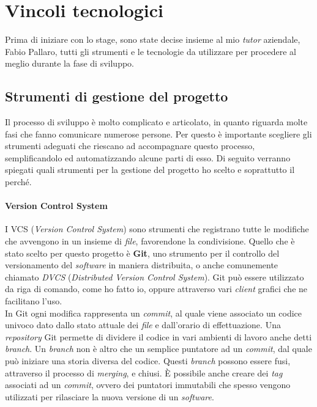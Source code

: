 
\section{Vincoli tecnologici}
Prima di iniziare con lo stage, sono state decise insieme al mio \textit{tutor} aziendale, Fabio Pallaro, tutti gli strumenti e le tecnologie da utilizzare per procedere al meglio durante la fase di sviluppo.

\subsection{Strumenti di gestione del progetto}
Il processo di sviluppo è molto complicato e articolato, in quanto riguarda molte fasi che fanno comunicare numerose persone. Per questo è importante scegliere gli strumenti adeguati che riescano ad accompagnare questo processo, semplificandolo ed automatizzando alcune parti di esso. Di seguito verranno spiegati quali strumenti per la gestione del progetto ho scelto e soprattutto il perché.

\paragraph{Version Control System}
I VCS (\textit{Version Control System}) sono strumenti che registrano tutte le modifiche che avvengono in un insieme di \textit{file}, favorendone la condivisione. Quello che è stato scelto per questo progetto è \textbf{Git}, uno strumento per il controllo del versionamento del \textit{software} in maniera distribuita, o anche comunemente chiamato \textit{DVCS} (\textit{Distributed Version Control System}). Git può essere utilizzato da riga di comando, come ho fatto io, oppure attraverso vari \textit{client} grafici che ne facilitano l'uso. \\

In Git ogni modifica rappresenta un \textit{commit}, al quale viene associato un codice univoco dato dallo stato attuale dei \textit{file} e dall'orario di effettuazione. Una \textit{repository} Git permette di dividere il codice in vari ambienti di lavoro anche detti \textit{branch}. Un \textit{branch} non è altro che un semplice puntatore ad un \textit{commit}, dal quale può iniziare una storia diversa del codice. Questi \textit{branch} possono essere fusi, attraverso il processo di \textit{merging}, e chiusi. È possibile anche creare dei \textit{tag} associati ad un \textit{commit}, ovvero dei puntatori immutabili che spesso vengono utilizzati per rilasciare la nuova versione di un \textit{software}. \\

